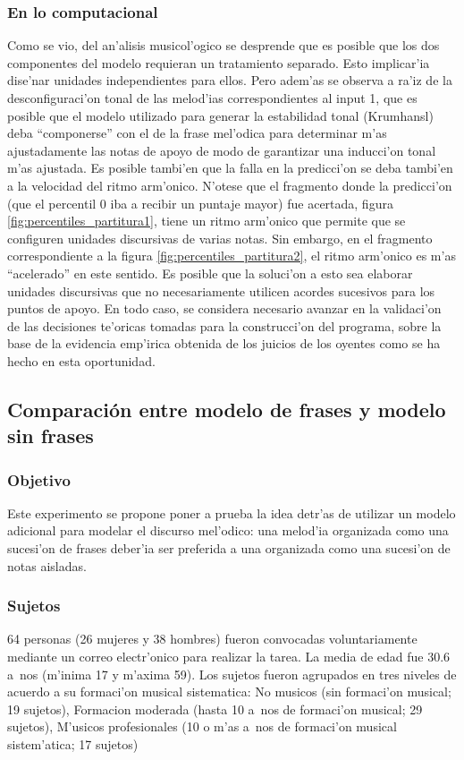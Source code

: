 \subsubsection{En lo computacional}
\label{sec:exp_percentiles_anal_comput}
Como se vio, del an'alisis musicol'ogico se desprende que es posible que los dos componentes del modelo requieran un tratamiento separado. 
Esto implicar'ia dise'nar unidades independientes para ellos.  Pero adem'as se observa a ra'iz de la desconfiguraci'on tonal de las melod'ias correspondientes al input 1, 
que es posible que el modelo utilizado para generar la estabilidad tonal (Krumhansl) deba ``componerse'' con el de la frase mel'odica para determinar m'as ajustadamente las 
notas de apoyo de modo de garantizar una inducci'on tonal m'as ajustada. 
Es posible tambi'en que la falla en la predicci'on se deba tambi'en a la velocidad del ritmo arm'onico. N'otese que el fragmento donde la predicci'on 
(que el percentil 0 iba a recibir un puntaje mayor) fue acertada, figura \ref{fig:percentiles_partitura1}, tiene un ritmo arm'onico que permite que se configuren unidades 
discursivas de varias notas. Sin embargo, en el fragmento correspondiente a la figura \ref{fig:percentiles_partitura2}, el ritmo arm'onico es m'as ``acelerado'' en este sentido. 
Es posible que la soluci'on a esto sea elaborar unidades discursivas que no necesariamente utilicen acordes sucesivos para los puntos de apoyo.
En todo caso, se considera necesario avanzar en la validaci'on de las decisiones te'oricas tomadas para la construcci'on del programa, sobre la base de la evidencia emp'irica 
obtenida de los juicios de los oyentes como se ha hecho en esta oportunidad.


\subsection{Comparaci\'on entre modelo de frases y modelo sin frases}
\label{sec:exp_frase}
\subsubsection{Objetivo}
Este experimento se propone poner a prueba la idea detr'as de utilizar un modelo adicional para modelar el discurso mel'odico: una melod'ia organizada
como una sucesi'on de frases deber'ia ser preferida a una organizada como una sucesi'on de notas aisladas.

\subsubsection{Sujetos}
64 personas (26 mujeres y 38 hombres) fueron convocadas voluntariamente mediante un correo electr'onico para realizar la tarea. La media de edad fue 30.6 a~nos (m'inima 17 y m'axima 59). Los sujetos fueron agrupados en tres niveles de acuerdo a su formaci'on
musical sistematica: No musicos (sin formaci'on musical; 19 sujetos), Formacion moderada (hasta 10 a~nos de formaci'on musical; 
29 sujetos), M'usicos profesionales (10 o m'as a~nos de formaci'on musical sistem'atica; 17 sujetos)

